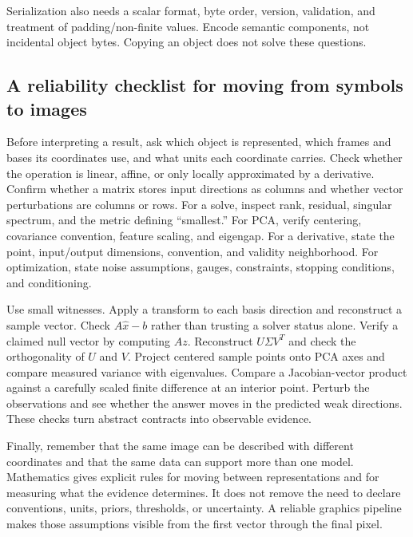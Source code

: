 Serialization also needs a scalar format, byte order, version, validation, and treatment of padding/non-finite values. Encode semantic components, not incidental object bytes. Copying an object does not solve these questions.

\subsection{A reliability checklist for moving from symbols to images}\label{02-foundations-ii-ch037-a-reliability-checklist-for-moving-from-symbols-to-images}

\hypertarget{02-foundations-ii-ch037-a-reliability-checklist-for-moving-from-symbols-to-images}{}

Before interpreting a result, ask which object is represented, which frames and bases its coordinates use, and what units each coordinate carries. Check whether the operation is linear, affine, or only locally approximated by a derivative. Confirm whether a matrix stores input directions as columns and whether vector perturbations are columns or rows. For a solve, inspect rank, residual, singular spectrum, and the metric defining ``smallest.'' For PCA, verify centering, covariance convention, feature scaling, and eigengap. For a derivative, state the point, input/output dimensions, convention, and validity neighborhood. For optimization, state noise assumptions, gauges, constraints, stopping conditions, and conditioning.

Use small witnesses. Apply a transform to each basis direction and reconstruct a sample vector. Check \(A\hat x-b\) rather than trusting a solver status alone. Verify a claimed null vector by computing \(Az\). Reconstruct \(U\Sigma V^T\) and check the orthogonality of \(U\) and \(V\). Project centered sample points onto PCA axes and compare measured variance with eigenvalues. Compare a Jacobian-vector product against a carefully scaled finite difference at an interior point. Perturb the observations and see whether the answer moves in the predicted weak directions. These checks turn abstract contracts into observable evidence.

Finally, remember that the same image can be described with different coordinates and that the same data can support more than one model. Mathematics gives explicit rules for moving between representations and for measuring what the evidence determines. It does not remove the need to declare conventions, units, priors, thresholds, or uncertainty. A reliable graphics pipeline makes those assumptions visible from the first vector through the final pixel.

